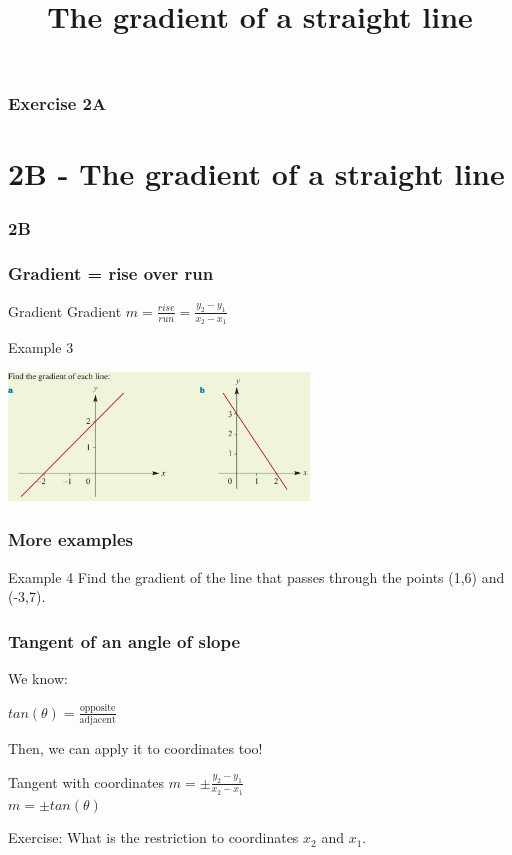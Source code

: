 \documentclass{beamer}
\begin{document}
\begin{frame}
    \frametitle{Exercise 2A}
\end{frame}

\section{2B - The gradient of a straight line}
\begin{frame}
    \frametitle{2B}
    \begin{center}
        \title{The gradient of a straight line}
        \maketitle
    \end{center}
\end{frame}

\begin{frame}[t]
    \frametitle{Gradient = rise over run}
    \begin{block}{Gradient}
        Gradient $m = \frac{rise}{run} = \frac{y_2-y_1}{x_2 - x_1}$
    \end{block}
    \begin{block}{Example 3}
        \begin{center}
            \includegraphics[width = 8cm]{Example3.png}
        \end{center}        
    \end{block}
\end{frame}

\begin{frame}[t]
    \frametitle{More examples}
    \begin{block}{Example 4}
        Find the gradient of the line that passes through the points (1,6) and (-3,7).
    \end{block}
\end{frame}

\begin{frame}
    \frametitle{Tangent of an angle of slope}
    We know:\\
    \begin{center}
        $tan(\theta) = \frac{\text{opposite}}{\text{adjacent}}$
    \end{center}
    Then, we can apply it to coordinates too!
    \begin{block}{Tangent with coordinates}
        $m = \pm\frac{y_2-y_1}{x_2 - x_1}$\\
        $m = \pm tan(\theta)$
    \end{block}
    Exercise: What is the restriction to coordinates $x_2$ and $x_1$.
\end{frame}
\end{document}
